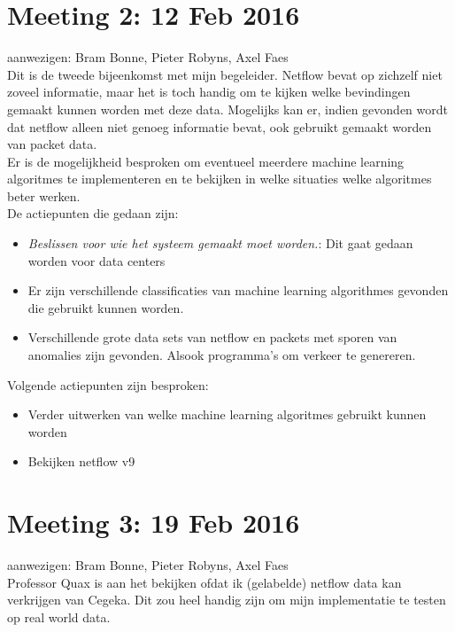 \section{Meeting 2: 12 Feb 2016}
aanwezigen: Bram Bonne, Pieter Robyns, Axel Faes\\

\noindent Dit is de tweede bijeenkomst met mijn begeleider. Netflow bevat op zichzelf niet zoveel informatie, maar het is toch handig om te kijken welke bevindingen gemaakt kunnen worden met deze data. Mogelijks kan er, indien gevonden wordt dat netflow alleen niet genoeg informatie bevat, ook gebruikt gemaakt worden van packet data. \\

\noindent Er is de mogelijkheid besproken om eventueel meerdere machine learning algoritmes te implementeren en te bekijken in welke situaties welke algoritmes beter werken.\\

\noindent De actiepunten die gedaan zijn:
\begin{itemize}  
        \item \textit{Beslissen voor wie het systeem gemaakt moet worden.}: Dit gaat gedaan worden voor data centers
        \item Er zijn verschillende classificaties van machine learning algorithmes gevonden die gebruikt kunnen worden.
        \item Verschillende grote data sets van netflow en packets met sporen van anomalies zijn gevonden. Alsook programma's om verkeer te genereren.
\end{itemize}

\noindent Volgende actiepunten zijn besproken:
\begin{itemize}  
		\item Verder uitwerken van welke machine learning algoritmes gebruikt kunnen worden
        \item Bekijken netflow v9
\end{itemize}
\section{Meeting 3: 19 Feb 2016}
aanwezigen: Bram Bonne, Pieter Robyns, Axel Faes\\

\noindent Professor Quax is aan het bekijken ofdat ik (gelabelde) netflow data kan verkrijgen van Cegeka. Dit zou heel handig zijn om mijn implementatie te testen op real world data.\\

